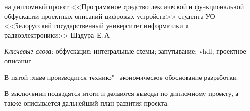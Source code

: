 \thispagestyle{empty}

\begin{center}
  \begin{minipage}{0.82\textwidth}
    на дипломный проект <<Программное средство лексической и функциональной обфускации проектных описаний цифровых устройств>> студента УО <<Белорусский государственный университет информатики и радиоэлектроники>> Шадура~Е.\,А.
  \end{minipage}
\end{center}

\emph{Ключевые слова}: обфускация; интегральные схемы; запутывание; vhdl; проектное описание.

\vspace{4\parsep}









В пятой главе производится технико"=экономическое обоснование разработки.

В заключении подводятся итоги и делаются выводы по дипломному проекту, а также описывается дальнейший план развития проекта.

\clearpage